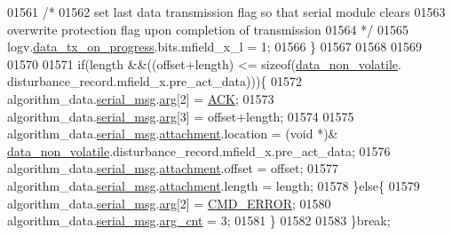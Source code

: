 \begin{DoxyCode}
{{{{{01561                         \textcolor{comment}{/*}
01562 \textcolor{comment}{                         set last data transmission flag so that serial module clears}
01563 \textcolor{comment}{                         overwrite protection flag upon completion of transmission}
01564 \textcolor{comment}{                       */}
01565                         logv.\hyperlink{a00021_a6cdefde69642ef511e3252c38be68516}{data\_tx\_on\_progress}.bits.mfield\_x\_l = 1;
01566                     \}
01567 
01568 
01569             
01570 
01571                    \textcolor{keywordflow}{if}(length &&((offset+length) <= \textcolor{keyword}{sizeof}(\hyperlink{a00060_a76ac5f917f5308dcd83de0d7c94559fb}{data\_non\_volatile}.
      disturbance\_record.mfield\_x.pre\_act\_data)))\{
01572                        algorithm\_data.\hyperlink{a00016_afcf5f557aea688aad985eec15269c1da}{serial\_msg}.\hyperlink{a00031_af7d6f762438c80072bd9dc0e4dd4ae1e}{arg}[2]                 = 
      \hyperlink{a00021_a6f6489887e08bff4887d0bc5dcf214d8}{ACK};
01573                        algorithm\_data.\hyperlink{a00016_afcf5f557aea688aad985eec15269c1da}{serial\_msg}.\hyperlink{a00031_af7d6f762438c80072bd9dc0e4dd4ae1e}{arg}[3]                 = offset+length;
01574 
01575                        algorithm\_data.\hyperlink{a00016_afcf5f557aea688aad985eec15269c1da}{serial\_msg}.\hyperlink{a00031_a040f6d5d58d18d8aeaf447eda7f50172}{attachment}.location    = (\textcolor{keywordtype}{void} *)&
      \hyperlink{a00060_a76ac5f917f5308dcd83de0d7c94559fb}{data\_non\_volatile}.disturbance\_record.mfield\_x.pre\_act\_data;
01576                        algorithm\_data.\hyperlink{a00016_afcf5f557aea688aad985eec15269c1da}{serial\_msg}.\hyperlink{a00031_a040f6d5d58d18d8aeaf447eda7f50172}{attachment}.offset      = offset;
01577                        algorithm\_data.\hyperlink{a00016_afcf5f557aea688aad985eec15269c1da}{serial\_msg}.\hyperlink{a00031_a040f6d5d58d18d8aeaf447eda7f50172}{attachment}.length      = length;
01578                      \}\textcolor{keywordflow}{else}\{
01579                          algorithm\_data.\hyperlink{a00016_afcf5f557aea688aad985eec15269c1da}{serial\_msg}.\hyperlink{a00031_af7d6f762438c80072bd9dc0e4dd4ae1e}{arg}[2]               = 
      \hyperlink{a00021_a1764a522e9c1a59a59be8757c69fa494}{CMD\_ERROR};
01580                          algorithm\_data.\hyperlink{a00016_afcf5f557aea688aad985eec15269c1da}{serial\_msg}.\hyperlink{a00031_a7b79f40e2eeec288091afd340bf8f591}{arg\_cnt}              = 3;
01581                      \}
01582 
01583                 \}\textcolor{keywordflow}{break};
}}}}}
\end{DoxyCode}
